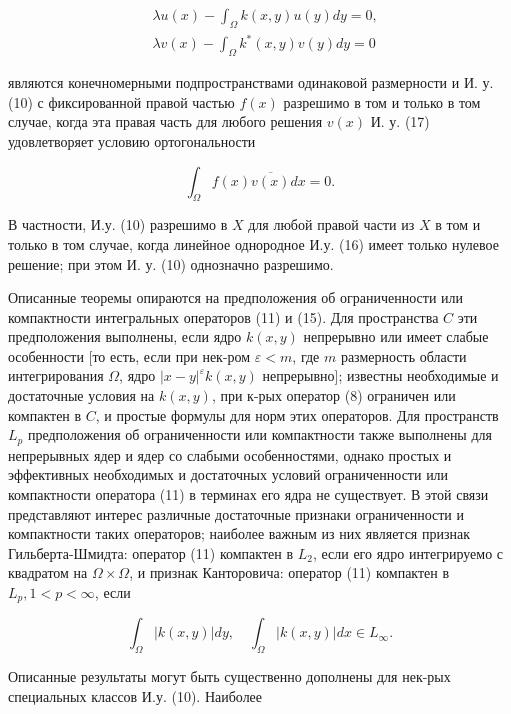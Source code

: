 \documentclass[10pt]{article}
\begin{document}
\[

\begin{aligned}

& \lambda u(x)-\int_{\Omega} k(x, y) u(y) d y=0, \\

& \lambda v(x)-\int_{\Omega} k^{*}(x, y) v(y) d y=0

\end{aligned}

\]



являются конечномерными подпространствами одинаковой размерности и И. у. (10) с фиксированной правой частью $f(x)$ разрешимо в том и только в том случае, когда эта правая часть для любого решения $v(x)$ И. у. (17) удовлетворяет условию ортогональности



\[

\int_{\Omega} f(x) \overline{v(x)} d x=0 .

\]



В частности, И.у. (10) разрешимо в $X$ для любой правой части из $X$ в том и только в том случае, когда линейное однородное И.у. (16) имеет только нулевое решение; при этом И. у. (10) однозначно разрешимо.



Описанные теоремы опираются на предположения об ограниченности или компактности интегральных операторов (11) и (15). Для пространства $C$ эти предположения выполнены, если ядро $k(x, y)$ непрерывно или имеет слабые особенности [то есть, если при нек-ром $\varepsilon<m$, где $m$ размерность области интегрирования $\Omega$, ядро $|x-y|^{\varepsilon} k(x, y)$ непрерывно]; известны необходимые и достаточные условия на $k(x, y)$, при к-рых оператор (8) ограничен или компактен в $C$, и простые формулы для норм этих операторов. Для пространств $L_{p}$ предположения об ограниченности или компактности также выполнены для непрерывных ядер и ядер со слабыми особенностями, однако простых и эффективных необходимых и достаточных условий ограниченности или компактности оператора (11) в терминах его ядра не существует. В этой связи представляют интерес различные достаточные признаки ограниченности и компактности таких операторов; наиболее важным из них является признак Гильберта-Шмидта: оператор (11) компактен в $L_{2}$, если его ядро интегрируемо с квадратом на $\Omega \times \Omega$, и признак Канторовича: оператор (11) компактен в $L_{p}, 1<p<\infty$, если



\[

\int_{\Omega}|k(x, y)| d y, \quad \int_{\Omega}|k(x, y)| d x \in L_{\infty} .

\]



Описанные результаты могут быть существенно дополнены для нек-рых специальных классов И.у. (10). Наиболее
\end{document}
